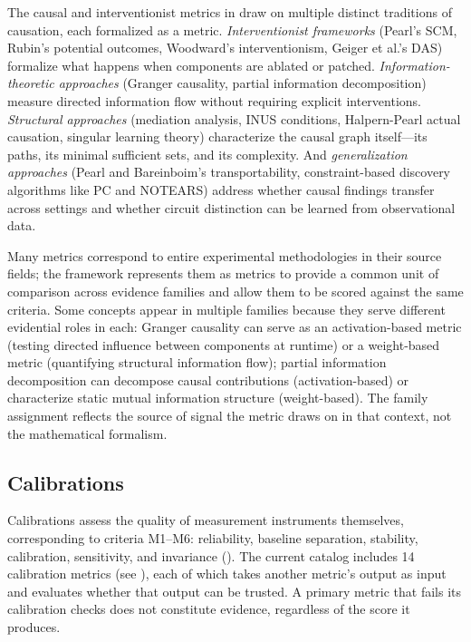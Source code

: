 \documentclass{article}
\begin{document}
The causal and interventionist metrics in  draw on multiple distinct traditions of causation, each formalized as a metric. \emph{Interventionist frameworks} (Pearl's SCM, Rubin's potential outcomes, Woodward's interventionism, Geiger et al.'s DAS) formalize what happens when components are ablated or patched. \emph{Information-theoretic approaches} (Granger causality, partial information decomposition) measure directed information flow without requiring explicit interventions. \emph{Structural approaches} (mediation analysis, INUS conditions, Halpern-Pearl actual causation, singular learning theory) characterize the causal graph itself---its paths, its minimal sufficient sets, and its complexity. And \emph{generalization approaches} (Pearl and Bareinboim's transportability, constraint-based discovery algorithms like PC and NOTEARS) address whether causal findings transfer across settings and whether circuit distinction can be learned from observational data.

Many metrics correspond to entire experimental methodologies in their source fields; the framework represents them as metrics to provide a common unit of comparison across evidence families and allow them to be scored against the same criteria. Some concepts appear in multiple families because they serve different evidential roles in each: Granger causality can serve as an activation-based metric (testing directed influence between components at runtime) or a weight-based metric (quantifying structural information flow); partial information decomposition can decompose causal contributions (activation-based) or characterize static mutual information structure (weight-based). The family assignment reflects the source of signal the metric draws on in that context, not the mathematical formalism.

\subsection{Calibrations}
\label{sec:calibrations}

Calibrations assess the quality of measurement instruments themselves, corresponding to criteria M1--M6: reliability, baseline separation, stability, calibration, sensitivity, and invariance (). The current catalog includes 14 calibration metrics (see ), each of which takes another metric's output as input and evaluates whether that output can be trusted. A primary metric that fails its calibration checks does not constitute evidence, regardless of the score it produces.
\end{document}
